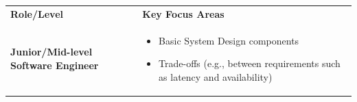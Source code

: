 \documentclass{article}
\begin{document}
\begin{center}
{\def\LTcaptype{none} %
\begin{longtable}[]{@{}
>{\centering\arraybackslash}p{}
>{\centering\arraybackslash}p{}@{}}
\toprule\noalign{}
\endhead
\bottomrule\noalign{}
\endlastfoot
\begin{minipage}[t]{\linewidth}\centering
\textbf{Role/Level}
\end{minipage} & \begin{minipage}[t]{\linewidth}\centering
\textbf{Key Focus Areas}
\end{minipage} \\
\begin{minipage}[t]{\linewidth}\centering
\textbf{Junior/Mid-level Software Engineer}
\end{minipage} & \begin{minipage}[t]{\linewidth}\centering
\begin{itemize}
\item
Basic System Design components
\item
Trade-offs (e.g., between requirements such as latency and availability)
\end{itemize}
\end{minipage} \\
\end{longtable}
}
\end{center}
\end{document}
